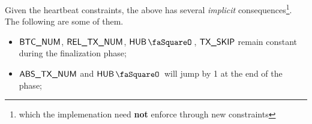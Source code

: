 \saNote{} Given the heartbeat constraints, the above has several \emph{implicit} consequences\footnote{which the implemenation need \textbf{not} enforce through new constraints}. The following are some of them.
\begin{itemize}
	\item $\textsf{BTC\_NUM}$, $\textsf{REL\_TX\_NUM}$, $\hubStamp$, $\textsf{TX}\textsf{\_SKIP}$ remain constant during the finalization phase;
	\item $\textsf{ABS\_TX\_NUM}$ and $\hubStamp$ will jump by 1 at the end of the phase;
\end{itemize}
